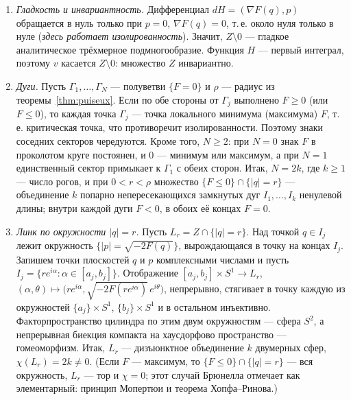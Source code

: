 \documentclass[11pt,a4paper]{article}
\theoremstyle{definition}
\begin{document}
\begin{enumerate}[leftmargin=*,label=\arabic*.]
\item \emph{Гладкость и инвариантность.} Дифференциал $dH=(\nabla F(q),p)$ обращается в нуль только
при $p=0$, $\nabla F(q)=0$, т.\,е. около нуля только в нуле (\emph{здесь работает изолированность}).
Значит, $Z\setminus0$ --- гладкое аналитическое трёхмерное подмногообразие. Функция $H$ --- первый
интеграл, поэтому $v$ касается $Z\setminus0$: множество $Z$ инвариантно.

\item \emph{Дуги.} Пусть $\Gamma_1,\dots,\Gamma_N$ --- полуветви $\{F=0\}$ и $\rho$ --- радиус из
теоремы~\ref{thm:puiseux}. Если по обе стороны от $\Gamma_j$ выполнено $F\ge0$ (или $F\le0$), то
каждая точка $\Gamma_j$ --- точка локального минимума (максимума) $F$, т.\,е. критическая точка, что
противоречит изолированности. Поэтому знаки соседних секторов чередуются. Кроме того, $N\ge2$: при
$N=0$ знак $F$ в проколотом круге постоянен, и $0$ --- минимум или максимум, а при $N=1$
единственный сектор примыкает к $\Gamma_1$ с обеих сторон. Итак, $N=2k$, где $k\ge1$ --- число рогов,
и при $0<r<\rho$ множество $\{F\le0\}\cap\{|q|=r\}$ --- объединение $k$ попарно непересекающихся
замкнутых дуг $I_1,\dots,I_k$ ненулевой длины; внутри каждой дуги $F<0$, в обоих её концах $F=0$.

\item \emph{Линк по окружности $|q|=r$.} Пусть $L_r=Z\cap\{|q|=r\}$. Над точкой $q\in I_j$ лежит
окружность $\{|p|=\sqrt{-2F(q)}\}$, вырождающаяся в точку на концах $I_j$. Запишем точки плоскостей
$q$ и $p$ комплексными числами и пусть $I_j=\{re^{i\alpha}:\alpha\in[a_j,b_j]\}$. Отображение
$[a_j,b_j]\times S^1\to L_r$, $(\alpha,\theta)\mapsto\bigl(re^{i\alpha},\sqrt{-2F(re^{i\alpha})}\,e^{i\theta}\bigr)$,
непрерывно, стягивает в точку каждую из окружностей $\{a_j\}\times S^1$, $\{b_j\}\times S^1$ и в остальном
инъективно. Факторпространство цилиндра по этим двум окружностям --- сфера $S^2$, а непрерывная
биекция компакта на хаусдорфово пространство --- гомеоморфизм. Итак, $L_r$ --- дизъюнктное объединение
$k$ двумерных сфер, $\chi(L_r)=2k\ne0$. (Если $F$ --- максимум, то $\{F\le0\}\cap\{|q|=r\}$ --- вся
окружность, $L_r$ --- тор и $\chi=0$; этот случай Брюнелла отмечает как элементарный: принцип
Мопертюи и теорема Хопфа--Ринова.)


\end{enumerate}
\end{document}
